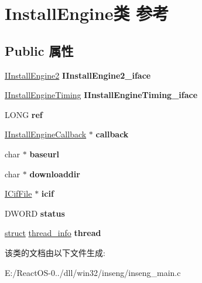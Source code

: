 \hypertarget{struct_install_engine}{}\section{Install\+Engine类 参考}
\label{struct_install_engine}
\subsection*{Public 属性}
\begin{DoxyCompactItemize}
\item 
\mbox{\label{struct_install_engine_a7f053355d21bbf3beb6da6fcdc149c71}} 
\hyperlink{interface_i_install_engine2}{I\+Install\+Engine2} {\bfseries I\+Install\+Engine2\+\_\+iface}
\item 
\mbox{\label{struct_install_engine_a40afcefa103c915b9560dfe0e41c7f7d}} 
\hyperlink{interface_i_install_engine_timing}{I\+Install\+Engine\+Timing} {\bfseries I\+Install\+Engine\+Timing\+\_\+iface}
\item 
\mbox{\label{struct_install_engine_a6e74be12cf6e7ca4c4543bd20218a151}} 
L\+O\+NG {\bfseries ref}
\item 
\mbox{\label{struct_install_engine_aff4225db22f0ce32d3fe8a765a1db50c}} 
\hyperlink{interface_i_install_engine_callback}{I\+Install\+Engine\+Callback} $\ast$ {\bfseries callback}
\item 
\mbox{\label{struct_install_engine_a12e23e9e91fe06bbcb0a11400c05da8d}} 
char $\ast$ {\bfseries baseurl}
\item 
\mbox{\label{struct_install_engine_afe6a8b6cd824b9107fdd4678017a7bea}} 
char $\ast$ {\bfseries downloaddir}
\item 
\mbox{\label{struct_install_engine_aff80d5cf3f4ac486dc8886af01dfcc78}} 
\hyperlink{interface_i_cif_file}{I\+Cif\+File} $\ast$ {\bfseries icif}
\item 
\mbox{\label{struct_install_engine_af72d47e87755c369f435e6227a1ca5bd}} 
D\+W\+O\+RD {\bfseries status}
\item 
\mbox{\label{struct_install_engine_ad68104d901576288b4bec3c82e6ea5d0}} 
\hyperlink{interfacestruct}{struct} \hyperlink{structthread__info}{thread\+\_\+info} {\bfseries thread}
\end{DoxyCompactItemize}


该类的文档由以下文件生成\+:\begin{DoxyCompactItemize}
\item 
E\+:/\+React\+O\+S-\/0../dll/win32/inseng/inseng\+\_\+main.\+c\end{DoxyCompactItemize}
